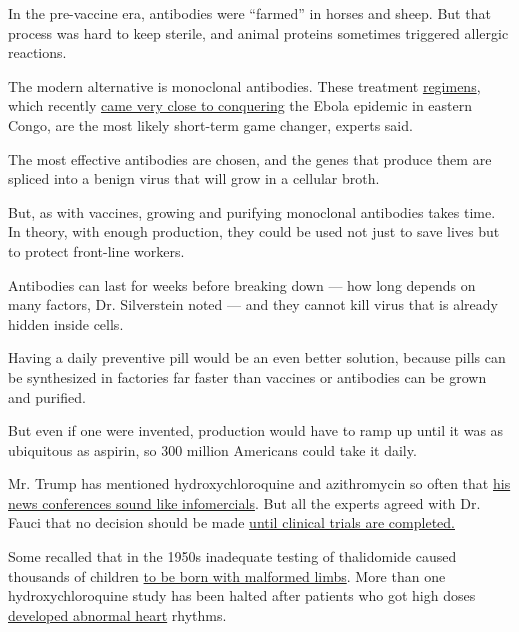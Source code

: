 In the pre-vaccine era, antibodies were ``farmed'' in horses and sheep.
But that process was hard to keep sterile, and animal proteins sometimes
triggered allergic reactions.

The modern alternative is monoclonal antibodies. These treatment
\href{https://www.nytimes3xbfgragh.onion/2019/08/12/health/ebola-outbreak-cure.html}{regimens},
which recently
\href{https://www.aljazeera.com/news/2020/04/relief-ebola-outbreak-drc-declared-200410121800377.html}{came
very close to conquering} the Ebola epidemic in eastern Congo, are the
most likely short-term game changer, experts said.

The most effective antibodies are chosen, and the genes that produce
them are spliced into a benign virus that will grow in a cellular broth.

But, as with vaccines, growing and purifying monoclonal antibodies takes
time. In theory, with enough production, they could be used not just to
save lives but to protect front-line workers.

Antibodies can last for weeks before breaking down --- how long depends
on many factors, Dr. Silverstein noted --- and they cannot kill virus
that is already hidden inside cells.

Having a daily preventive pill would be an even better solution, because
pills can be synthesized in factories far faster than vaccines or
antibodies can be grown and purified.

But even if one were invented, production would have to ramp up until it
was as ubiquitous as aspirin, so 300 million Americans could take it
daily.

Mr. Trump has mentioned hydroxychloroquine and azithromycin so often
that
\href{https://www.nytimes3xbfgragh.onion/2020/04/04/health/coronavirus-drug-trump-hydroxycholoroquine.html}{his
news conferences sound like infomercials}. But all the experts agreed
with Dr. Fauci that no decision should be made
\href{https://www.nytimes3xbfgragh.onion/2020/04/17/health/trump-hydroxychloroquine-coronavirus.html}{until
clinical trials are completed.}

Some recalled that in the 1950s inadequate testing of thalidomide caused
thousands of children
\href{http://broughttolife.sciencemuseum.org.uk/broughttolife/themes/controversies/thalidomide}{to
be born with malformed limbs}. More than one hydroxychloroquine study
has been halted after patients who got high doses
\href{https://www.nytimes3xbfgragh.onion/2020/04/12/health/chloroquine-coronavirus-trump.html}{developed
abnormal heart} rhythms.

